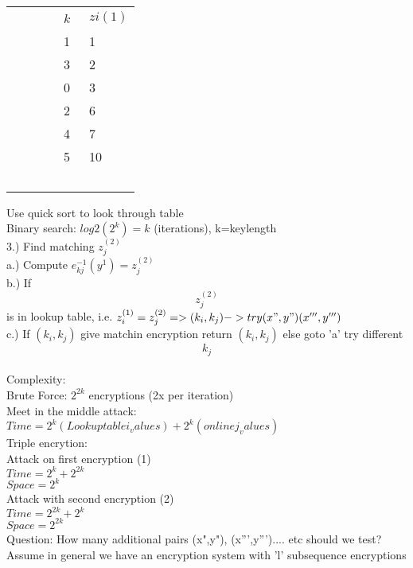 \documentclass[12pt,letterpaper]{article}
\begin{document}
\begin{table}
    \begin{tabular}{|l|l|}
        $k$ & $zi(1)$ \\
        1  & 1     \\ 
        3  & 2     \\ 
        0  & 3     \\ 
        2  & 6     \\ 
        4  & 7     \\ 
        5  & 10    \\
    \end{tabular}
\end{table}

Use quick sort to look through table\\
Binary search: \(log2(2^k)=k \) (iterations), k=keylength\\


3.) Find matching \(z_{j}^{(2)}\)\\
a.) Compute \(e_{kj}^{-1}(y^1)=z_{j}^{(2)}\)\\
b.) If \[z_{j}^{(2)}\] is in lookup table, i.e. \(z_{i}^{(1)}=z_{j}^{(2)} => (k_{i},k_{j}) -> try (x",y")(x''',y''')\)\\
c.) If \((k_{i},k_{j})\) give matchin encryption return \((k_{i},k_{j})\) else goto 'a' try different \[k_{j}\]\\


Complexity:\\
Brute Force: \(2^{2k}\) encryptions (2x per iteration)\\
Meet in the middle attack: \(Time = 2^k(Lookup table i_values) + 2^k (online j_values)\)\\


Triple encrytion:\\
Attack on first encryption (1)\\
\(Time = 2^k+2^{2k}\)\\
\(Space = 2^k\)\\
Attack with second encryption (2)\\
\(Time = 2^{2k}+2^{k}\)\\
\(Space = 2^{2k}\)\\


Question: How many additional pairs (x",y"), (x''',y''').... etc should we test?\\

Assume in general we have an encryption system with 'l' subsequence encryptions\\
\end{document}
